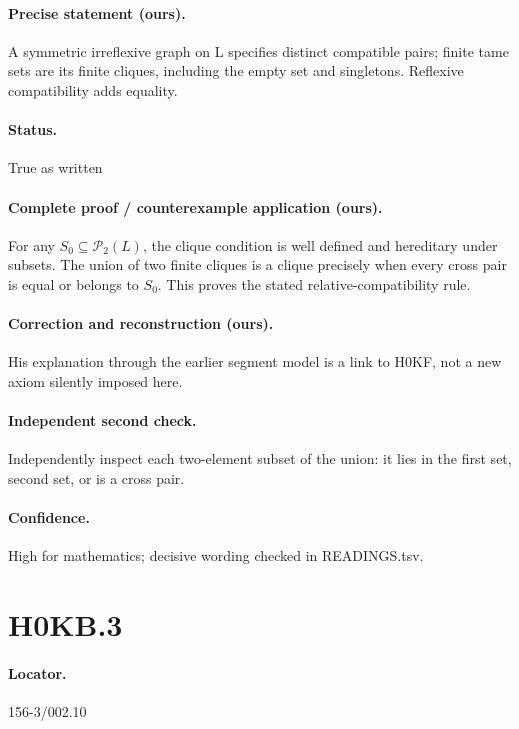 \paragraph{Precise statement (ours).} A symmetric irreflexive graph on L specifies distinct compatible pairs; finite tame sets are its finite cliques, including the empty set and singletons. Reflexive compatibility adds equality.

\paragraph{Status.} True as written

\paragraph{Complete proof / counterexample application (ours).} For any \(S_0\subseteq\mathcal P_2(L)\), the clique condition is well defined and hereditary under subsets. The union of two finite cliques is a clique precisely when every cross pair is equal or belongs to \(S_0\). This proves the stated relative-compatibility rule.

\paragraph{Correction and reconstruction (ours).} His explanation through the earlier segment model is a link to H0KF, not a new axiom silently imposed here.

\paragraph{Independent second check.} Independently inspect each two-element subset of the union: it lies in the first set, second set, or is a cross pair.

\paragraph{Confidence.} High for mathematics; decisive wording checked in READINGS.tsv.

\section*{H0KB.3}\label{statement:H0KB.3}
\paragraph{Locator.} 156-3/002.10

